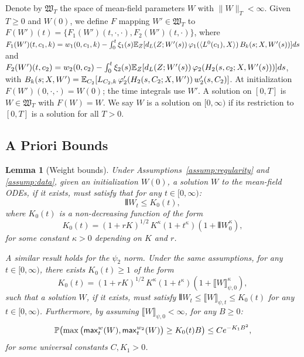 \documentclass[nohyperref]{article}
\theoremstyle{plain}
\newtheorem{lemma}[theorem]{Lemma}
\theoremstyle{definition}
\theoremstyle{remark}
\begin{document}
Denote by $\mathfrak{W}_T$ the space of mean-field parameters $W$ with $\|W\|_T<\infty$. Given $T\ge 0$ and $W(0)$, we define $F$ mapping $W'\in\mathfrak{W}_T$ to $F(W')(t) = \{F_1(W')(t,\cdot,\cdot), F_2(W')(t,\cdot)\}$, where $F_1(W')(t,c_1,k) = w_1(0,c_1,k) - \int_0^t \xi_1(s)\mathbb{E}_{Z}[d_L(Z;W'(s))\,\varphi_1(\langle L^0(c_1), X \rangle)\,B_k(s;X,W'(s))]ds$ and $F_2(W')(t,c_2) = w_2(0,c_2) - \int_0^t \xi_2(s)\mathbb{E}_{Z}[d_L(Z;W'(s))\,\varphi_2(H_2(s,c_2;X,W'(s)))]ds$, with $B_k(s;X,W')=\mathbb{E}_{C_2}[L_{C_2,k}\,\varphi_2'(H_2(s,C_2;X,W'))\,w_2'(s,C_2)]$. At initialization $F(W')(0,\cdot,\cdot)=W(0)$; the time integrals use $W'$. A solution on $[0,T]$ is $W\in\mathfrak{W}_T$ with $F(W)=W$. We say $W$ is a solution on $[0,\infty)$ if its restriction to $[0,T]$ is a solution for all $T>0$.

\subsection{A Priori Bounds}

\begin{lemma}[Weight bounds]
\label{lem:bounds-a-priori}
Under Assumptions~\ref{assump:regularity} and \ref{assump:data}, given an initialization $W(0)$, a solution $W$ to the mean-field ODEs, if it exists, must satisfy that for any $t\in[0,\infty)$:
\[
{\interleave{W}}_t \le K_0(t),
\]
where $K_0(t)$ is a non-decreasing function of the form
\[
K_0(t) = (1+rK)^{1/2}\,K^{\kappa}(1+t^{\kappa})(1+{\interleave{W}}_0^{\kappa}),
\]
for some constant $\kappa>0$ depending on $K$ and $r$.

A similar result holds for the $\psi_2$ norm. Under the same assumptions, for any $t\in[0,\infty)$, there exists $K_0(t)\ge 1$ of the form
\[
K_0(t) = (1+rK)^{1/2}\,K^{\kappa}(1+t^{\kappa})(1+\llbracket W\rrbracket_{\psi,0}^{\kappa}),
\]
such that a solution $W$, if it exists, must satisfy ${\interleave{W}}_t \le \llbracket W\rrbracket_{\psi,t} \le K_0(t)$ for any $t\in[0,\infty)$. Furthermore, by assuming $\llbracket W\rrbracket_{\psi,0}<\infty$, for any $B\ge 0$:
\[
\mathbb{P}\!\left(\max\big(\mathsf{max}_t^w(W), \mathsf{max}_t^{w_2}(W)\big)\ge K_0(t)B\right) \le C e^{-K_1 B^2},
\]
for some universal constants $C, K_1>0$.
\end{lemma}
\end{document}
